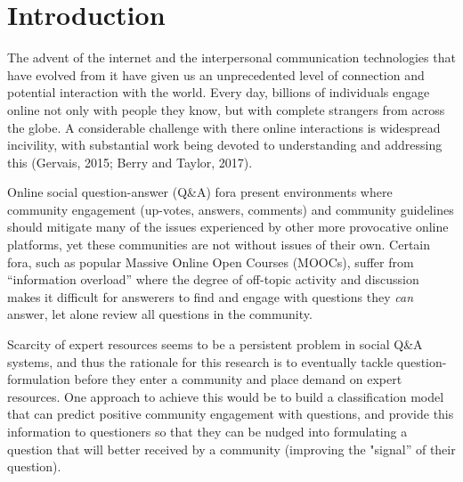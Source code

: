 \documentclass[12pt,preprint, authoryear]{article}
\numberwithin{equation}{section}
\numberwithin{figure}{section}
\numberwithin{table}{section}
\begin{document}
\newpage

\renewcommand{\contentsname}{Contents}
\hypersetup{linkcolor=black}
\tableofcontents
\newpage
\hypersetup{linkcolor=black}
\listoftables
\newpage
\hypersetup{linkcolor=black}
\listoffigures
\hypersetup{linkcolor=black}
\newpage


\renewcommand{\vec}[1]{\mathbf{#1}}


\section{\texorpdfstring{Introduction
\label{Intro}}{Introduction }}\label{introduction}

The advent of the internet and the interpersonal communication
technologies that have evolved from it have given us an unprecedented
level of connection and potential interaction with the world. Every day,
billions of individuals engage online not only with people they know,
but with complete strangers from across the globe. A considerable
challenge with there online interactions is widespread incivility, with
substantial work being devoted to understanding and addressing this
(Gervais, 2015; Berry and Taylor, 2017).

Online social question-answer (Q\&A) fora present environments where
community engagement (up-votes, answers, comments) and community
guidelines should mitigate many of the issues experienced by other more
provocative online platforms, yet these communities are not without
issues of their own. Certain fora, such as popular Massive Online Open
Courses (MOOCs), suffer from ``information overload'' where the degree
of off-topic activity and discussion makes it difficult for answerers to
find and engage with questions they \emph{can} answer, let alone review
all questions in the community.

Scarcity of expert resources seems to be a persistent problem in social
Q\&A systems, and thus the rationale for this research is to eventually
tackle question-formulation before they enter a community and place
demand on expert resources. One approach to achieve this would be to
build a classification model that can predict positive community
engagement with questions, and provide this information to questioners
so that they can be nudged into formulating a question that will better
received by a community (improving the "signal'' of their question).
\end{document}
